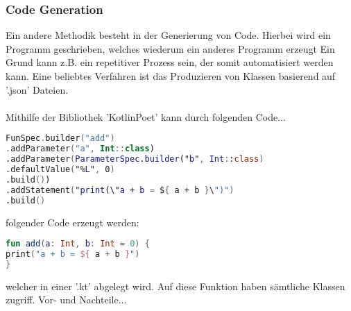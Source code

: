 \subsubsection{Code Generation}
Ein andere Methodik besteht in der Generierung von Code. Hierbei wird ein Programm geschrieben, welches wiederum ein anderes Programm erzeugt Ein Grund kann z.B. ein repetitiver Prozess sein, der somit automatisiert werden kann. Eine beliebtes Verfahren ist das Produzieren von Klassen basierend auf '.json' Dateien.
\\
\\
Mithilfe der Bibliothek 'KotlinPoet' kann durch folgenden Code...
\begin{lstlisting}[caption={Code zum erezugen einer Funktion}, label={lst:data-class}, language=Kotlin]
FunSpec.builder("add")
.addParameter("a", Int::class)
.addParameter(ParameterSpec.builder("b", Int::class)
.defaultValue("%L", 0)
.build())
.addStatement("print(\"a + b = ${ a + b }\")")
.build()
\end{lstlisting}
\bigskip
folgender Code erzeugt werden:
\begin{lstlisting}[caption={Erzeugte Funktionen}, label={lst:data-class}, language=Kotlin]
fun add(a: Int, b: Int = 0) {
print("a + b = ${ a + b }")
}
\end{lstlisting}
welcher in einer '.kt' abgelegt wird. Auf diese Funktion haben sämtliche Klassen zugriff.
Vor- und Nachteile...
